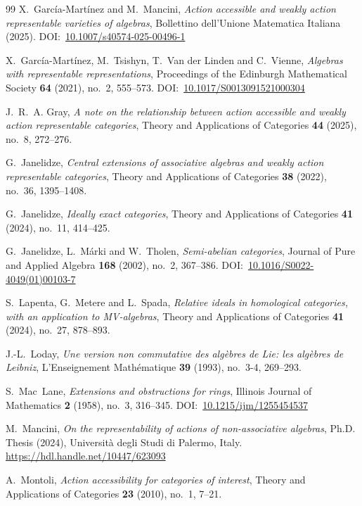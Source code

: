\documentclass[reqno,a4paper]{amsart}
\renewcommand{\doi}[1]{DOI:~\href{https://doi.org/#1}{#1}}
\theoremstyle{plain}
\theoremstyle{definition}
\theoremstyle{remark}
\numberwithin{equation}{section}
\begin{document}
\begin{thebibliography}{99}
X.~García-Martínez and M.~Mancini, \emph{Action accessible and weakly action representable varieties of algebras}, Bollettino dell'Unione Matematica Italiana (2025). \doi{10.1007/s40574-025-00496-1}

X.~García-Martínez, M.~Tsishyn, T.~Van der Linden and C.~Vienne, \emph{Algebras with representable representations}, Proceedings of the Edinburgh Mathematical Society \textbf{64} (2021), no.~2, 555--573. \doi{10.1017/S0013091521000304}

J.~R.~A. Gray, \emph{A note on the relationship between action accessible and weakly action representable categories}, Theory and Applications of Categories \textbf{44} (2025), no.~8, 272--276.

G.~Janelidze, \emph{Central extensions of associative algebras and weakly action representable categories}, Theory and Applications of Categories \textbf{38} (2022), no.~36, 1395--1408.

G.~Janelidze, \emph{Ideally exact categories}, Theory and Applications of Categories \textbf{41} (2024), no.~11, 414--425.

G.~Janelidze, L.~Márki and W.~Tholen, \emph{Semi-abelian categories}, Journal of Pure and Applied Algebra \textbf{168} (2002), no.~2, 367--386. \doi{10.1016/S0022-4049(01)00103-7}

S.~Lapenta, G.~Metere and L.~Spada, \emph{Relative ideals in homological categories, with an application to MV-algebras}, Theory and Applications of Categories \textbf{41} (2024), no.~27, 878--893.

J.-L.~Loday, \emph{Une version non commutative des algèbres de Lie: les algèbres de Leibniz}, L'Enseignement Math\'ematique \textbf{39} (1993), no.~3-4, 269--293.

S.~Mac~Lane, \emph{Extensions and obstructions for rings}, Illinois Journal of Mathematics \textbf{2} (1958), no.~3, 316--345. \doi{10.1215/ijm/1255454537}

M.~Mancini, \emph{On the representability of actions of non-associative algebras}, Ph.D. Thesis (2024), Università degli Studi di Palermo, Italy. \url{https://hdl.handle.net/10447/623093}

A.~Montoli, \emph{Action accessibility for categories of interest}, Theory and Applications of Categories \textbf{23} (2010), no.~1, 7--21.


\end{thebibliography}
\end{document}
